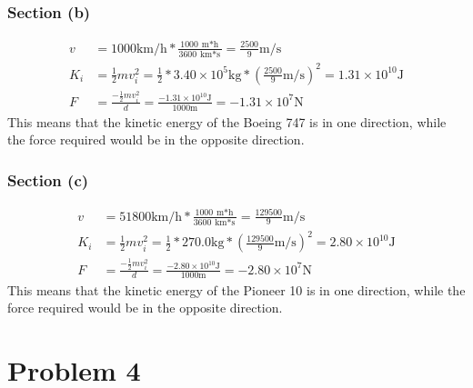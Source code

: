 \documentclass[12pt]{article}
\begin{document}
\pagebreak
\subsubsection*{Section (b)}
\begin{align*}
    v   &= 1000 \unit{\kilo\meter/\hour} * \frac{1000\ \unit{\meter*\hour}}{3600\ \unit{\kilo\meter*\second}} 
        = \frac{2500}{9} \unit{\meter/\second}\\
    K_i &= \frac{1}{2}mv_i^2 
        = \frac{1}{2} * 3.40 \times 10^5 \unit{\kilo\gram} * \left( \frac{2500}{9} \unit{\meter/\second} \right)^2 
        = 1.31 \times 10^{10} \unit{\joule}\\
    F   &= \frac{-\frac{1}{2}mv_i^2}{d}
        = \frac{-1.31 \times 10^10 \unit{\joule}}{1000 \unit{\meter}}
        = -1.31 \times 10^7 \unit{\newton}
\end{align*}
This means that the kinetic energy of the Boeing 747 is  in one direction, while the force required would be  in the opposite direction.

\subsubsection*{Section (c)}
\begin{align*}
    v   &= 51800 \unit{\kilo\meter/\hour} * \frac{1000\ \unit{\meter*\hour}}{3600\ \unit{\kilo\meter*\second}} 
        = \frac{129500}{9} \unit{\meter/\second}\\
    K_i &= \frac{1}{2}mv_i^2 
        = \frac{1}{2} * 270.0 \unit{\kilo\gram} * \left( \frac{129500}{9} \unit{\meter/\second} \right)^2 
        = 2.80 \times 10^{10} \unit{\joule}\\
    F   &= \frac{-\frac{1}{2}mv_i^2}{d}
        = \frac{-2.80 \times 10^{10} \unit{\joule}}{1000 \unit{\meter}}
        = -2.80 \times 10^7 \unit{\newton}
\end{align*}
This means that the kinetic energy of the Pioneer 10 is  in one direction, while the force required would be  in the opposite direction.

\pagebreak
\section*{Problem 4}
\end{document}
